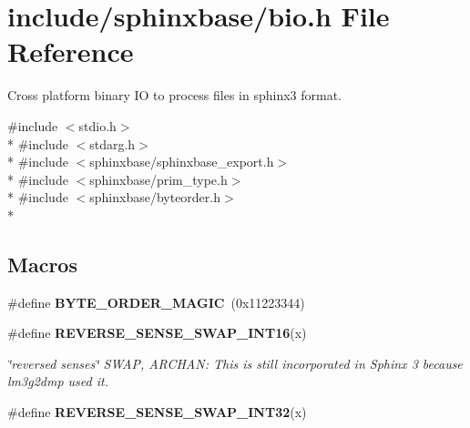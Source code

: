 \section{include/sphinxbase/bio.h File Reference}
\label{bio_8h}


Cross platform binary I\+O to process files in sphinx3 format.  


{\ttfamily \#include $<$stdio.\+h$>$}\\*
{\ttfamily \#include $<$stdarg.\+h$>$}\\*
{\ttfamily \#include $<$sphinxbase/sphinxbase\+\_\+export.\+h$>$}\\*
{\ttfamily \#include $<$sphinxbase/prim\+\_\+type.\+h$>$}\\*
{\ttfamily \#include $<$sphinxbase/byteorder.\+h$>$}\\*
\subsection*{Macros}
\begin{DoxyCompactItemize}
\item 
\#define {\bfseries B\+Y\+T\+E\+\_\+\+O\+R\+D\+E\+R\+\_\+\+M\+A\+G\+I\+C}~(0x11223344)\label{bio_8h_ac08e1e4728563a03ff6c937bfa8fd845}

\item 
\#define {\bf R\+E\+V\+E\+R\+S\+E\+\_\+\+S\+E\+N\+S\+E\+\_\+\+S\+W\+A\+P\+\_\+\+I\+N\+T16}(x)
\begin{DoxyCompactList}\small\item\em \char`\"{}reversed senses\char`\"{} S\+W\+A\+P, A\+R\+C\+H\+A\+N\+: This is still incorporated in Sphinx 3 because lm3g2dmp used it. \end{DoxyCompactList}\item 
\#define {\bfseries R\+E\+V\+E\+R\+S\+E\+\_\+\+S\+E\+N\+S\+E\+\_\+\+S\+W\+A\+P\+\_\+\+I\+N\+T32}(x)\label{bio_8h_a2c277e579a007b5c46bd762a7d18b2cf}

\end{DoxyCompactItemize}
